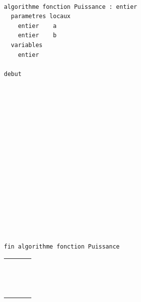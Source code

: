 \documentclass[11pt,a4paper]{article}
\begin{document}
\begin{table}[ht!]
  \centering
  \begin{minipage}{0.59\textwidth}
    \centering
\begin{lstlisting}[style=algorithmique]

algorithme fonction Puissance : entier
  parametres locaux
    entier    a
    entier    b
  variables
    entier

debut

















fin algorithme fonction Puissance
 \end{lstlisting}
  \end{minipage}
  \hfillx
  \begin{minipage}{0.4\textwidth}
    \centering
    \begin{tabular}{|C{1cm}|C{1cm}|C{1cm}|C{1cm}|}
        \hline
             &     &     &     \\
        \hline
             &     &     &   \\
             &     &     &     \\
             &     &     &   \\
        \hline
             &     &     &   \\
             &     &     &     \\
             &     &     &   \\
        \hline
             &     &     &   \\
             &     &     &     \\
             &     &     &   \\
        \hline
             &     &     &   \\
             &     &     &     \\
             &     &     &   \\
        \hline
             &     &     &   \\
             &     &     &     \\
             &     &     &   \\
        \hline
    \end{tabular}
  \end{minipage}
\end{table}
\end{document}
